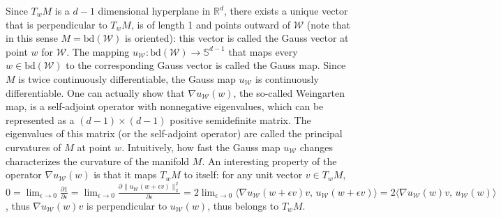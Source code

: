 \documentclass[english]{article}
\newcommand{\cW}{\mathcal{W}}
\newcommand{\real}{\mathbb{R}}
\newcommand{\bS}{\mathbb{S}}
\newcommand{\bd}{\mathrm{bd}}
\begin{document}
Since $T_w M$ is a $d-1$ dimensional hyperplane in $\real^d$, there exists a unique vector that is perpendicular to $T_wM$, is of length 1 and points outward of $\cW$ (note that in this sense $M=\bd(\cW)$ is oriented): this vector is called the Gauss vector at point $w$ for $\cW$. The mapping $u_{\cW}:\bd(\cW) \rightarrow \bS^{d-1}$ that maps every $w\in \bd(\cW)$ to the corresponding Gauss vector is called the Gauss map. Since $M$ is twice continuously differentiable, the Gauss map $u_{\cW}$ is continuously differentiable.
One can actually show that $\nabla u_{\cW}(w)$, the so-called Weingarten map, is a self-adjoint operator with nonnegative eigenvalues, which can be represented as a $(d-1)\times (d-1)$ positive semidefinite matrix.
The eigenvalues of this matrix (or the self-adjoint operator) are called the principal curvatures of $M$ at point $w$. Intuitively, how fast the Gauss map $u_{\cW}$ changes characterizes the curvature of the manifold $M$. An interesting property of the operator $\nabla u_{\cW}(w)$ is that it maps $T_w M$ to itself: for any unit vector $v\in T_wM$, $0 = \lim_{\epsilon\rightarrow 0} \frac{\partial 1}{\partial \epsilon} = \lim_{\epsilon\rightarrow 0}\frac{\partial \|u_{\cW}(w+\epsilon v)\|_2^2}{\partial \epsilon} = 2\lim_{\epsilon\rightarrow 0}\langle \nabla u_{\cW}(w+\epsilon v)v,\, u_{\cW}(w+\epsilon v)\rangle = 2\langle \nabla u_{\cW}(w)v,\, u_{\cW}(w)\rangle$ , thus $\nabla u_{\cW}(w)v$ is perpendicular to $u_{\cW}(w)$, thus belongs to $T_wM$.
\end{document}
